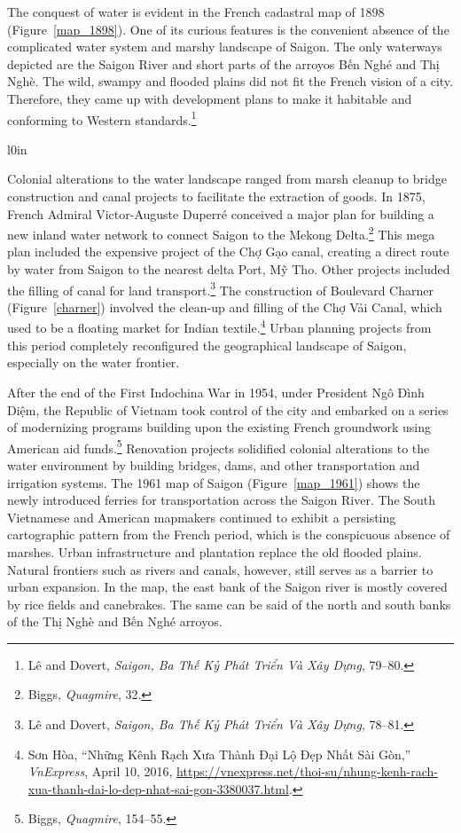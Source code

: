 The conquest of water is evident in the French cadastral map of 1898 (Figure~\ref{map_1898}). One of its curious features is the convenient absence of the complicated water system and marshy landscape of Saigon. The only waterways depicted are the Saigon River and short parts of the arroyos \vi Bến Nghé and Thị Nghè. The wild, swampy and flooded plains did not fit the French vision of a city. Therefore, they came up with development plans to make it habitable and conforming to Western standards.\footnote{Lê and Dovert, \textit{Saigon, Ba Thế Kỷ Phát Triển Và Xây Dựng}, 79–80.}
\en
\begin{wrapfigure}{l}{0in}
\caption[Boulevard Charner]{Boulevard Charner (marked red)}
\label{charner}
\end{wrapfigure}
\vi Colonial alterations to the water landscape ranged from marsh cleanup to bridge construction and canal projects to facilitate the extraction of goods. In 1875, French Admiral Victor-Auguste Duperré conceived a major plan for building a new inland water network to connect Saigon to the Mekong Delta.\footnote{Biggs, \textit{Quagmire}, 32.} This mega plan included the expensive project of the Chợ Gạo canal, creating a direct route by water from Saigon to the nearest delta Port, Mỹ Tho. Other projects included the filling of canal for land transport.\footnote{Lê and Dovert, \textit{Saigon, Ba Thế Kỷ Phát Triển Và Xây Dựng}, 78–81.} The construction of Boulevard Charner (Figure~\ref{charner}) involved the clean-up and filling of the Chợ Vải Canal, which used to be a floating market for Indian textile.\footnote{Sơn Hòa, “Những Kênh Rạch Xưa Thành Đại Lộ Đẹp Nhất Sài Gòn,” \textit{VnExpress}, April 10, 2016, \url{https://vnexpress.net/thoi-su/nhung-kenh-rach-xua-thanh-dai-lo-dep-nhat-sai-gon-3380037.html}.} Urban planning projects from this period completely reconfigured the geographical landscape of Saigon, especially on the water frontier.

After the end of the First Indochina War in 1954, under President Ngô Đình Diệm, the Republic of Vietnam took control of the city and embarked on a series of modernizing programs building upon the existing French groundwork using American aid funds.\footnote{Biggs, \textit{Quagmire}, 154–55.} Renovation projects solidified colonial alterations to the water environment by building bridges, dams, and other transportation and irrigation systems. The 1961 map of Saigon (Figure~\ref{map_1961}) shows the newly introduced ferries for transportation across the Saigon River. The South Vietnamese and American mapmakers continued to exhibit a persisting cartographic pattern from the French period, which is the conspicuous absence of marshes. Urban infrastructure and plantation replace the old flooded plains. Natural frontiers such as rivers and canals, however, still serves as a barrier to urban expansion. In the map, the east bank of the Saigon river is mostly covered by rice fields and canebrakes. The same can be said of the north and south banks of the Thị Nghè and Bến Nghé arroyos.

